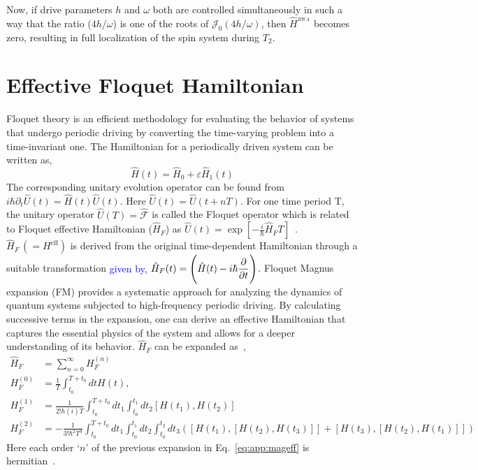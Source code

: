 \documentclass[%
reprint,
superscriptaddress,
amsmath,amssymb,showkeys,
aps,
prb,
]{revtex4-2}
\newcommand{\blue}[1]{\textcolor{blue}{#1}}
\begin{document}
	Now, if drive parameters $h$ and  $\omega$ both are controlled simultaneously in such a way that the ratio ($4h/\omega$) is one of the roots of $\mathcal{J}_0(4h/\omega)$, then $\hat{H}^{_{RWA}}$ becomes zero, resulting in full localization of the spin system during $T_2$.


	\section{\label{AppendixB} Effective Floquet Hamiltonian}
	
	Floquet theory is an efficient methodology for evaluating the behavior of systems that undergo periodic driving by converting the time-varying problem into a time-invariant one. The Hamiltonian for a periodically driven system can be written as,
	\begin{equation*}
		\hat{H}(t) = \hat{H}_0 + \varepsilon \hat{H}_1(t)
	\end{equation*}
	The corresponding unitary evolution operator can be found from $\displaystyle{i\hbar \partial_t \hat{U}(t) = \hat{H}(t) \hat{U}(t)}$. Here $\displaystyle{\hat{U}(t) = \hat{U}(t+ nT)}$. For one time period T, the unitary operator $\displaystyle \hat{U}(T) = \hat{\mathcal{F}}$ is called the Floquet operator which is related to Floquet effective Hamiltonian ($\hat{H}_F$) as $\hat{U}(t) = \exp[-\frac{i}{\hbar}\hat{H}_F T]$~\cite{Eckardt_2015}. $\hat{H}_F\,(=H^\mathrm{eff})$ is derived from the original time-dependent Hamiltonian through a suitable transformation  \blue{given by, $\displaystyle \hat{H}_F(t) = \Bigg(\hat{H}(t) - i\hbar \pdv{t}\Bigg)$}\cite{linda_chaos}. Floquet Magnus expansion (FM) provides a systematic approach for analyzing the dynamics of quantum systems subjected to high-frequency periodic driving. By calculating successive terms in the expansion, one can derive an effective Hamiltonian that captures the essential physics of the system and allows for a deeper understanding of its behavior. $\hat{H}_F$ can be expanded as~\cite{Sen_2021},	
	\begin{align}
		\hat{H}_F &= \sum_{n=0}^{\infty} H_F^{(n)}\nonumber\\
		H_F^{(0)} &= \frac{1}{T} \int_{t_0}^{T+t_0} dt H(t), \nonumber\\
		H_F^{(1)} &= \frac{1}{2!\hbar(i)T} \int_{t_0}^{T+t_0} dt_1  \int_{t_0}^{t_1} dt_2 [H(t_1), H(t_2)]\nonumber\\
		H_F^{(2)} &= -\frac{1}{3!\hbar^2 T^3} \int_{t_0}^{T+t_0} dt_1  \int_{t_0}^{t_1} dt_2 \int_{t_0}^{t_2} dt_3([H(t_1),[H(t_2), H(t_3)]] + [H(t_3),[H(t_2), H(t_1)]])
		\label{eq:app:mageff}
	\end{align} 
	Here each order `$n$' of the previous expansion in Eq.~\ref{eq:app:mageff} is hermitian~\cite{haldar_statistical_2022}.
	
\end{document}
